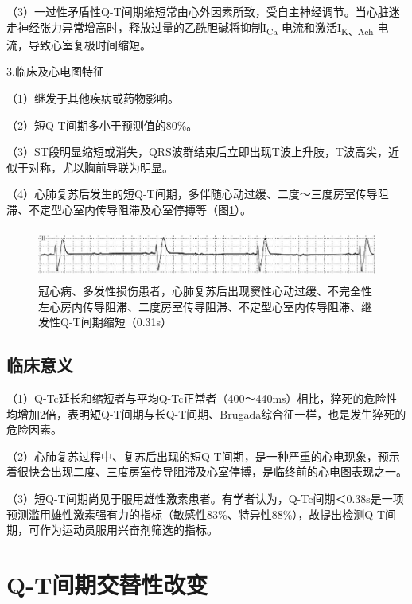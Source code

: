 （3）一过性矛盾性Q-T间期缩短常由心外因素所致，受自主神经调节。当心脏迷走神经张力异常增高时，释放过量的乙酰胆碱将抑制I\textsubscript{Ca}
电流和激活I\textsubscript{K、Ach} 电流，导致心室复极时间缩短。

3.临床及心电图特征

（1）继发于其他疾病或药物影响。

（2）短Q-T间期多小于预测值的80\%。

（3）ST段明显缩短或消失，QRS波群结束后立即出现T波上升肢，T波高尖，近似于对称，尤以胸前导联为明显。

（4）心肺复苏后发生的短Q-T间期，多伴随心动过缓、二度～三度房室传导阻滞、不定型心室内传导阻滞及心室停搏等（图\ref{fig7-5}）。

\begin{figure}[!htbp]
 \centering
 \includegraphics[width=5.89583in,height=0.66667in]{./images/Image00118.jpg}
 \captionsetup{justification=centering}
 \caption{冠心病、多发性损伤患者，心肺复苏后出现窦性心动过缓、不完全性左心房内传导阻滞、二度房室传导阻滞、不定型心室内传导阻滞、继发性Q-T间期缩短（0.31s）}
 \label{fig7-5}
  \end{figure} 

\protect\hypertarget{text00013.htmlux5cux23subid107}{}{}

\subsection{临床意义}

（1）Q-Tc延长和缩短者与平均Q-Tc正常者（400～440ms）相比，猝死的危险性均增加2倍，表明短Q-T间期与长Q-T间期、Brugada综合征一样，也是发生猝死的危险因素。

（2）心肺复苏过程中、复苏后出现的短Q-T间期，是一种严重的心电现象，预示着很快会出现二度、三度房室传导阻滞及心室停搏，是临终前的心电图表现之一。

（3）短Q-T间期尚见于服用雄性激素患者。有学者认为，Q-Tc间期＜0.38s是一项预测滥用雄性激素强有力的指标（敏感性83\%、特异性88\%），故提出检测Q-T间期，可作为运动员服用兴奋剂筛选的指标。

\protect\hypertarget{text00013.htmlux5cux23subid108}{}{}

\section{Q-T间期交替性改变}

